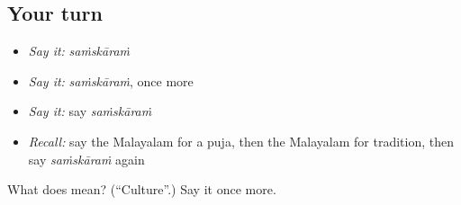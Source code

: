 \subsection*{Your turn}
\begin{itemize}
\raggedright
  \item \emph{Say it:} \emph{saṁskāraṁ}
  \item \emph{Say it:} \emph{saṁskāraṁ}, once more
  \item \emph{Say it:} say \emph{saṁskāraṁ}
  \item \emph{Recall:} say the Malayalam for a puja, then the Malayalam for tradition, then say \emph{saṁskāraṁ} again
\end{itemize}

\begin{tcolorbox}[breakable,colback=teal!4,colframe=teal!35!black,title={Before you move on}]
What does  mean? (\textquotedblleft{}Culture\textquotedblright{}.) Say it once more.
\end{tcolorbox}
